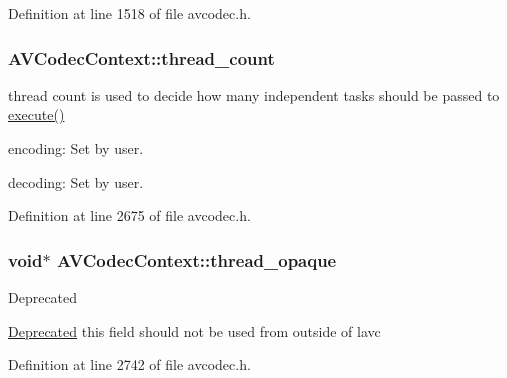 Definition at line 1518 of file avcodec.\+h.

\subsubsection[{\texorpdfstring{thread\+\_\+count}{thread_count}}]{ A\+V\+Codec\+Context\+::thread\+\_\+count}\hypertarget{struct_a_v_codec_context_aa852b6227d0778b62e9cc4034ad3720c}{}\label{struct_a_v_codec_context_aa852b6227d0778b62e9cc4034ad3720c}
thread count is used to decide how many independent tasks should be passed to \hyperlink{struct_a_v_codec_context_a83b625bf9454b63ee8c04ac4f8ef648c}{execute()}
\begin{DoxyItemize}
\item encoding\+: Set by user.
\item decoding\+: Set by user. 
\end{DoxyItemize}

Definition at line 2675 of file avcodec.\+h.

\subsubsection[{\texorpdfstring{thread\+\_\+opaque}{thread_opaque}}]{ {\bf void}$\ast$ A\+V\+Codec\+Context\+::thread\+\_\+opaque}\hypertarget{struct_a_v_codec_context_aeed57307d47f36a39905f206eee8dd96}{}\label{struct_a_v_codec_context_aeed57307d47f36a39905f206eee8dd96}
\begin{DoxyRefDesc}{Deprecated}
\item[\hyperlink{deprecated__deprecated000021}{Deprecated}]this field should not be used from outside of lavc \end{DoxyRefDesc}


Definition at line 2742 of file avcodec.\+h.

